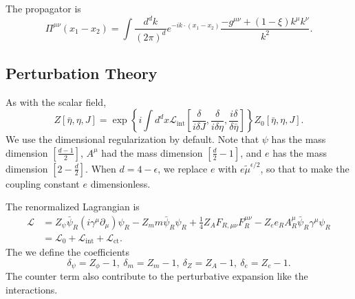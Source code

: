 The propagator is
\begin{equation}
	\Pi^{\mu\nu}(x_1-x_2) = \int \frac{d^d k}{(2\pi)^d} e^{-ik\cdot(x_1-x_2)}\frac{-g^{\mu\nu}+(1-\xi)k^\mu k^\nu}{k^2}.
\end{equation}


\subsection{Perturbation Theory}
As with the scalar field, 
\begin{equation}
	Z[\bar\eta,\eta,J] = \exp\left\{i\int d^dx \mathcal{L}_{\mathrm{int}}\left[\frac{\delta}{i\delta J},\frac{\delta}{i\delta \eta},\frac{i\delta}{\delta \bar\eta}\right]\right\} Z_0[\bar\eta,\eta,J].
\end{equation}
We use the dimensional regularization by default. 
Note that $\psi$ has the mass dimension $[\frac{d-1}{2}]$, $A^\mu$ had the mass dimension $[\frac{d}{2}-1]$, and $e$ has the mass dimension $[2-\frac{d}{2}]$.
When $d=4-\epsilon$, we replace $e$ with $e \tilde{\mu}^{\epsilon/2}$, so that to make the coupling constant $e$ dimensionless.

The renormalized Lagrangian is
\begin{equation}
\begin{aligned}
	\mathcal L 
		&= Z_{\psi} \bar\psi_R(i\gamma^\mu \partial_\mu)\psi_R 
		-Z_m m \bar\psi_R\psi_R 
		+ \frac{1}{4} Z_{A} F_{R,\mu\nu}F_R^{\mu\nu} - Z_e e_R A_R^\mu \bar\psi_R\gamma^\mu \psi_R \\
		&= \mathcal{L}_0 + \mathcal{L}_{\mathrm{int}} + \mathcal{L}_{\mathrm{ct}}.
\end{aligned}
\end{equation}
The we define the coefficients
\begin{equation}
	\delta_{\psi} = Z_\phi - 1,\ 
	\delta_{m} = Z_m - 1,\ 
	\delta_Z = Z_A - 1, \ 
	\delta_e = Z_e - 1.
\end{equation}
The counter term also contribute to the perturbative expansion like the interactions.


